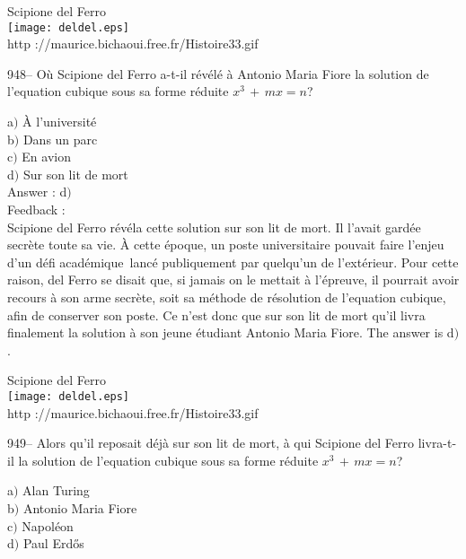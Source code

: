 ﻿\documentclass[letterpaper, 12pt]{article}
\begin{document}
        \begin{center}
        Scipione del Ferro\\
    \texttt{[image: deldel.eps]}\\
        {\footnotesize http ://maurice.bichaoui.free.fr/Histoire33.gif}
    \end{center}

948-- O\`u Scipione del Ferro a-t-il r\'ev\'el\'e \`a Antonio Maria
Fiore la solution de l'equation cubique sous sa forme r\'eduite
$x^3\,+\,mx=n$?

a$)$ \`A l'universit\'e \\
b$)$ Dans un parc \\
c$)$ En avion \\
d$)$ Sur son lit de mort\\

Answer : d$)$\\

Feedback : \\
Scipione del Ferro r\'ev\'ela cette solution sur son lit de mort. Il
l'avait gard\'ee secr\`ete toute sa vie. \`A cette \'epoque, un
poste universitaire pouvait faire l'enjeu d'un \og d\'efi
acad\'emique\fg\ lanc\'e publiquement par quelqu'un de
l'ext\'erieur. Pour cette raison, del Ferro se disait que, si jamais
on le mettait \`a l'\'epreuve, il pourrait avoir recours \`a son
arme secr\`ete, soit sa m\'ethode de r\'esolution de l'equation
cubique, afin de conserver son poste. Ce n'est donc que sur son lit
de mort qu'il livra finalement la solution \`a son jeune
\'etudiant Antonio Maria Fiore. The answer is d$)$.\\

        \begin{center}
        Scipione del Ferro\\
    \texttt{[image: deldel.eps]}\\
        {\footnotesize http ://maurice.bichaoui.free.fr/Histoire33.gif}
    \end{center}

949-- Alors qu'il reposait d\'ej\`a sur son lit de mort, \`a qui
Scipione del Ferro livra-t-il la solution de l'equation cubique
sous sa forme r\'eduite $x^3\,+\,mx=n$?

a$)$ Alan Turing \\
b$)$ Antonio Maria Fiore \\
c$)$ Napol\'eon \\
d$)$ Paul Erd\H{o}s\\
\end{document}
